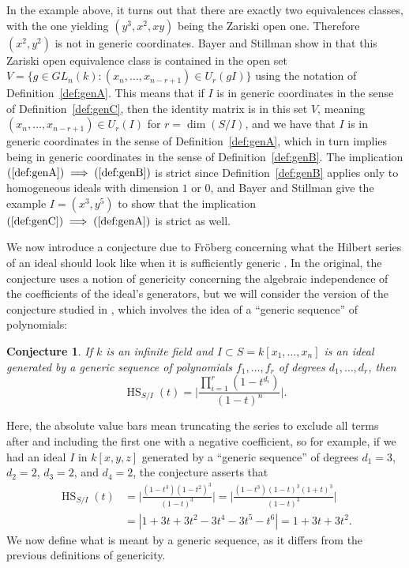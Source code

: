 \documentclass[11pt]{article}
\DeclareMathOperator{\HS}{HS}
\newtheorem{conjecture}{Conjecture}
\theoremstyle{definition}
\begin{document}
In the example above, it turns out that there are exactly two equivalences classes, with the one yielding $(y^3, x^2, xy)$ being the Zariski open one. Therefore $(x^2,y^2)$ is not in generic coordinates. Bayer and Stillman show in \cite{bayer1987criterion} that this Zariski open equivalence class is contained in the open set $V = \{g \in GL_n(k) : (x_n, \dots, x_{n - r + 1}) \in U_r(gI)\}$ using the notation of Definition~\ref{def:genA}. This means that if $I$ is in generic coordinates in the sense of Definition~\ref{def:genC}, then the identity matrix is in this set $V$, meaning $(x_n, \dots, x_{n - r + 1}) \in U_r(I)$ for $r = \dim(S/I)$, and we have that $I$ is in generic coordinates in the sense of Definition~\ref{def:genA}, which in turn implies being in generic coordinates in the sense of Definition~\ref{def:genB}. The implication $(\ref{def:genA}) \implies (\ref{def:genB})$ is strict since Definition~\ref{def:genB} applies only to homogeneous ideals with dimension $1$ or $0$, and Bayer and Stillman give the example $I = (x^3, y^5)$ to show that the implication $(\ref{def:genC}) \implies (\ref{def:genA})$ is strict as well. 

We now introduce a conjecture due to Fröberg concerning what the Hilbert series of an ideal should look like when it is sufficiently generic \cite{froberg1985inequality}. In the original, the conjecture uses a notion of genericity concerning the algebraic independence of the coefficients of the ideal's generators, but we will consider the version of the conjecture studied in \cite{pardue2010generic}, which involves the idea of a ``generic sequence'' of polynomials: 


\begin{conjecture}\label{Fr}
	If $k$ is an infinite field and $I \subset S = k[x_1, \dots, x_n]$ is an ideal generated by a generic sequence of polynomials $f_1, \dots, f_r$ of degrees $d_1, \dots, d_r$, then \[ \HS_{S/I}(t) = \bigg| \frac{\prod_{i=1}^r (1 - t^{d_i})}{(1 - t)^n} \bigg|. \] 
\end{conjecture}


Here, the absolute value bars mean truncating the series to exclude all terms after and including the first one with a negative coefficient, so for example, if we had an ideal $I$ in $k[x,y,z]$ generated by a ``generic sequence'' of degrees $d_1 = 3$, $d_2 = 2$, $d_3 = 2$, and $d_4 = 2$, the conjecture asserts that \begin{align*}
	\HS_{S/I}(t) &= \bigg| \frac{(1 - t^3)(1 - t^2)^3}{(1 - t)^3} \bigg| = \bigg| \frac{(1 - t^3)(1 - t)^3(1 + t)^3}{(1 - t)^3} \bigg| \\
	&= |1 + 3t + 3t^2 - 3t^4 - 3t^5 - t^6| = 1 + 3t + 3t^2.
\end{align*} We now define what is meant by a generic sequence, as it differs from the previous definitions of genericity. 
\end{document}
